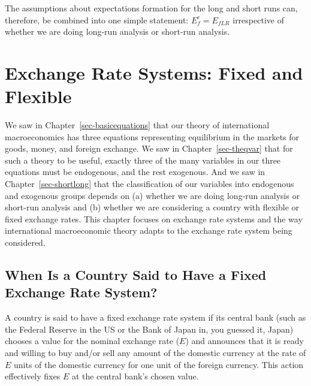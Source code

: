 \documentclass[
  letterpaper,
]{book}
\theoremstyle{plain}
\theoremstyle{remark}
\begin{document}
The assumptions about expectations formation for the long and short runs
can, therefore, be combined into one simple statement: \(E^e_f=E_{fLR}\)
irrespective of whether we are doing long-run analysis or short-run
analysis.


\chapter{Exchange Rate Systems: Fixed and Flexible}\label{sec-exchsys}

We saw in Chapter~\ref{sec-basicequations} that our theory of
international macroeconomics has three equations representing
equilibrium in the markets for goods, money, and foreign exchange. We
saw in Chapter~\ref{sec-theqvar} that for such a theory to be useful,
exactly three of the many variables in our three equations must be
endogenous, and the rest exogenous. And we saw in
Chapter~\ref{sec-shortlong} that the classification of our variables
into endogenous and exogenous groups depends on (a) whether we are doing
long-run analysis or short-run analysis and (b) whether we are
considering a country with flexible or fixed exchange rates. This
chapter focuses on exchange rate systems and the way international
macroeconomic theory adapts to the exchange rate system being
considered.

\section{When Is a Country Said to Have a Fixed Exchange Rate
System?}\label{sec-fixexrates}

A country is said to have a fixed exchange rate
system if its central bank (such as the
Federal Reserve in the US or the Bank of Japan in, you guessed it,
Japan) chooses a value for the nominal exchange rate (\(E\)) and
announces that it is ready and willing to buy and/or sell any amount of
the domestic currency at the rate of \(E\) units of the domestic
currency for one unit of the foreign currency. This action effectively
fixes \(E\) at the central bank's chosen
value.
\end{document}
